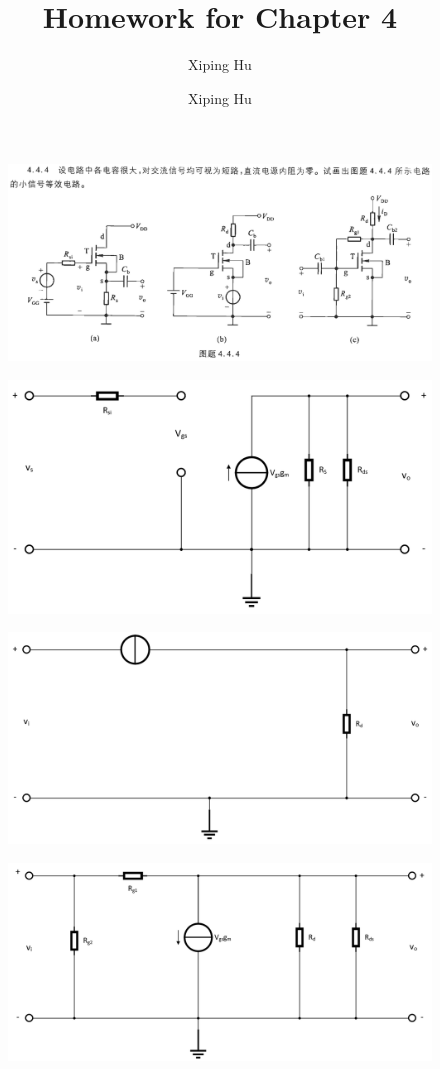 \documentclass{article}
\author{Xiping Hu}
\author{Xiping Hu}
\affil{https://hxp.plus/}
\title{Homework for Chapter 4}
\begin{document}
\maketitle

\begin{figure}[H]
  \centering
  \includegraphics[width=\linewidth]{figures/Problem444}
  \label{fig:}
\end{figure}

\begin{figure}[H]
  \centering
  \includegraphics[width=0.7\linewidth]{figures/Problem4441}
  \label{fig:}
\end{figure}

\begin{figure}[H]
  \centering
  \includegraphics[width=0.7\linewidth]{figures/Problem4442}
  \label{fig:}
\end{figure}

\begin{figure}[H]
  \centering
  \includegraphics[width=0.7\linewidth]{figures/Problem4443}
  \label{fig:}
\end{figure}
\end{document}
